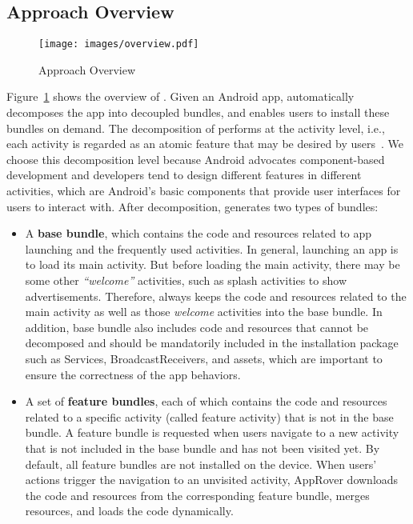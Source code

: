 \subsection{Approach Overview}

\begin{figure}[t]
	\centering
    \texttt{[image: images/overview.pdf]}
    \caption{Approach Overview} 
    \label{fig:approach_overview}
\end{figure}

Figure~\ref{fig:approach_overview} shows the overview of \nickName{}. Given an Android app, \nickName{} automatically decomposes the app into decoupled bundles, and enables users to install these bundles on demand. The decomposition of \nickName{} performs at the activity level, i.e., each activity is regarded as an atomic feature that may be desired by users~\cite{Ubicomp17Lu}. We choose this decomposition level because Android advocates component-based development and developers tend to design different features in different activities, which are Android's basic components that provide user interfaces for users to interact with. After decomposition, \nickName{} generates two types of bundles:

\begin{itemize}
	\item {A \textbf{base bundle}, which contains the code and resources related to app launching and the frequently used
activities. In general, launching an app is to load its main activity. But before loading the main activity, there may be some other \emph{``welcome''} activities, such as splash activities to show advertisements. Therefore, \nickName{} always keeps the code and resources related to the main activity as well as those \emph{welcome} activities into the base bundle. In addition, base bundle also includes code and resources that cannot be decomposed and should be mandatorily included in the installation package such as Services, BroadcastReceivers, and assets, which are important to ensure the correctness of the app behaviors.}
    \item {A set of \textbf{feature bundles}, each of which contains the code and resources related to a specific activity (called feature activity) that
        is not in the base bundle. A feature bundle is requested when users navigate to a new activity that is not included in the base bundle and has not been visited yet. By default, all feature bundles are not installed on the device. When users' actions trigger the navigation to an unvisited activity, AppRover downloads the code and resources from the corresponding feature bundle, merges resources, and loads the code dynamically.}
\end{itemize}



